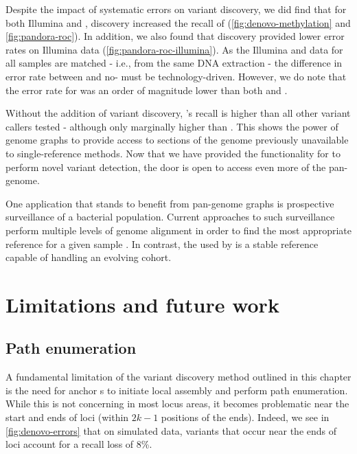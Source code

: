 Despite the impact of \ont{} systematic errors on \denovo{} variant discovery, we did find that for both Illumina and \ont{}, \denovo{} discovery increased the recall of \pandora{} (\autoref{fig:denovo-methylation} and \autoref{fig:pandora-roc}). In addition, we also found that \denovo{} discovery provided lower error rates on Illumina data (\autoref{fig:pandora-roc-illumina}). As the Illumina and \ont{} data for all samples are matched - i.e., from the same DNA extraction - the difference in error rate between \denovo{} and no-\denovo{} must be technology-driven. However, we do note that the \pandora{} error rate for \ont{} was an order of magnitude lower than both  and .

\noindent
Without the addition of \denovo{} variant discovery, \pandora{}'s recall is higher than all other variant callers tested - although only marginally higher than . This shows the power of genome graphs to provide access to sections of the genome previously unavailable to single-reference methods. Now that we have provided the functionality for \pandora{} to perform novel variant detection, the door is open to access even more of the pan-genome. 

One application that stands to benefit from pan-genome graphs is prospective surveillance of a bacterial population. Current approaches to such surveillance perform multiple levels of genome alignment in order to find the most appropriate reference for a given sample \cite{Gorrie2021}. In contrast, the \panrg{} used by \pandora{} is a stable reference capable of handling an evolving cohort.

\section{Limitations and future work}
\label{sec:denovo-limits}

\subsection{Path enumeration}
\label{sec:fw-path-enum}

A fundamental limitation of the \denovo{} variant discovery method outlined in this chapter is the need for anchor \kmer{}s to initiate local assembly and perform path enumeration. While this is not concerning in most locus areas, it becomes problematic near the start and ends of loci (within $2k-1$ positions of the ends). Indeed, we see in \autoref{fig:denovo-errors} that on simulated data, variants that occur near the ends of loci account for a recall loss of 8\%.

